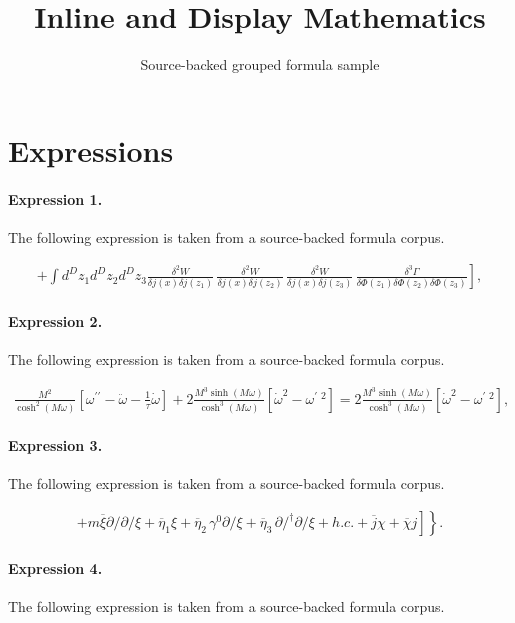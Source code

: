 \documentclass[11pt]{article}
\title{Inline and Display Mathematics}
\author{Source-backed grouped formula sample}
\date{}
\begin{document}
\maketitle
\section{Expressions}
\paragraph{Expression 1.} The following expression is taken from a source-backed formula corpus.

\begin{align*}+ \int\!\!d^D\!z_1 d^D\!z_2 d^D\!z_3 \left. \frac{\delta^2 W}{\delta j(x) \delta j(z_1)} \, \frac{\delta^2 W}{\delta j(x) \delta j(z_2)} \, \frac{\delta^2 W}{\delta j(x) \delta j(z_3)} \, \frac{\delta^3 \Gamma} {\delta \Phi(z_1) \delta \Phi(z_2) \delta \Phi(z_3)} \right] ,\end{align*}

\paragraph{Expression 2.} The following expression is taken from a source-backed formula corpus.

\begin{align*}\frac{M^2}{\cosh ^2(M\omega )}[\omega ^{\prime \prime }-\ddot \omega -\frac1\tau \dot \omega ]+2\frac{M^3\sinh (M\omega )}{\cosh ^3(M\omega )}[\dot\omega ^2-\omega ^{\prime }{}^{\;2}]=2\frac{M^3\sinh (M\omega )}{\cosh^3(M\omega )}[\dot \omega ^2-\omega ^{\prime }{}^{\;2}],\end{align*}

\paragraph{Expression 3.} The following expression is taken from a source-backed formula corpus.

\begin{align*}\left. \left. + m \overline{\xi} \partial\!\!\!/ \partial\!\!\!/ \xi +\overline{\eta}_1 \xi + \overline{\eta}_2 \,\gamma ^0\partial \!\!\!/ \xi + \overline{\eta}_3\,\partial\!\!\!/^\dagger\partial\!\!\!/ \xi + h. c. + \overline{j} \chi + \overline{\chi} j \right] \right\}.\end{align*}

\paragraph{Expression 4.} The following expression is taken from a source-backed formula corpus.
\end{document}

